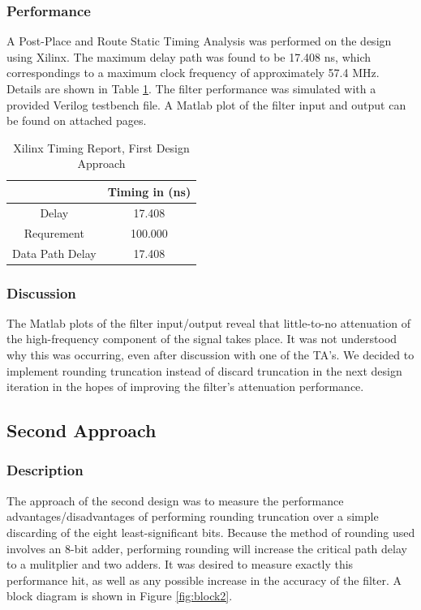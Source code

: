 \lstset{language=verilog}


\subsubsection*{Performance}
A Post-Place and Route Static Timing Analysis was performed on the design using Xilinx. The maximum delay path was found to be 17.408 ns, which correspondings to a maximum clock frequency of approximately 57.4 MHz. Details are shown in Table \ref{tab:timing1}. The filter performance was simulated with a provided Verilog testbench file. A Matlab plot of the filter input and output can be found on attached pages.

\begin{table}[h]
\begin{center}
\caption{Xilinx Timing Report, First Design Approach}
\begin{tabular}{c|c}
           & Timing in (ns) \\
\hline
     Delay &   17.408  \\

Requrement &    100.000    \\

Data Path Delay &  17.408   \\
\end{tabular}  
\end{center}
\label{tab:timing1}
\end{table}


\subsubsection*{Discussion}
The Matlab plots of the filter input/output reveal that little-to-no attenuation of the high-frequency component of the signal takes place. It was not understood why this was occurring, even after discussion with one of the TA's. We decided to implement rounding truncation instead of discard truncation in the next design iteration in the hopes of improving the filter's attenuation performance.


\subsection*{Second Approach}
\subsubsection*{Description}
The approach of the second design was to measure the performance advantages/disadvantages of performing rounding truncation over a simple discarding of the eight least-significant bits. Because the method of rounding used involves an 8-bit adder, performing rounding will increase the critical path delay to a mulitplier and two adders. It was desired to measure exactly this performance hit, as well as any possible increase in the accuracy of the filter. A block diagram is shown in Figure \ref{fig:block2}.

